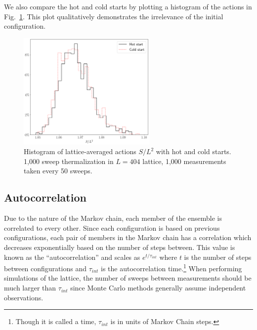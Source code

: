 We also compare the hot and cold starts by plotting a histogram of the actions in Fig.~\ref{fig:coldstart}. This plot qualitatively demonstrates the irrelevance of the initial configuration.
\begin{figure}[h]
  \centering
    \includegraphics[width=0.6\textwidth]{imgs/coldstart.png}
  \caption{\label{fig:coldstart} Histogram of lattice-averaged actions $S/L^2$ with hot and cold starts. 1,000 sweep thermalization in $L=404$ lattice, 1,000 measurements taken every 50 sweeps.}
\end{figure}

\subsection{Autocorrelation}
Due to the nature of the Markov chain, each member of the ensemble is correlated to every other. Since each configuration is based on previous configurations, each pair of members in the Markov chain has a correlation which decreases exponentially based on the number of steps between. This value is known as the ``autocorrelation'' and scales as $e^{t/\tau_{int}}$ where $t$ is the number of steps between configurations and $\tau_{int}$ is the autocorrelation time.\footnote{Though it is called a time, $\tau_{int}$ is in units of Markov Chain steps.} When performing simulations of the lattice, the number of sweeps between measurements should be much larger than $\tau_{int}$ since Monte Carlo methods generally assume independent observations.

